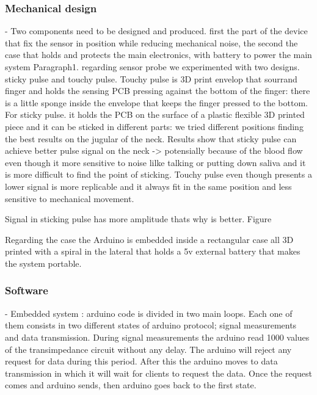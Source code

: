 \documentclass[conference]{IEEEtran}
\begin{document}
      \subsubsection{Mechanical design}
            - Two components need to be designed and produced. first the part of the device that fix the sensor in position while reducing mechanical noise, the second the case that holds and protects the main electronics, 
            with battery to power the main system
            Paragraph1. regarding sensor probe we experimented with two designs. sticky pulse and touchy pulse. Touchy pulse is 3D print envelop that sourrand finger 
            and holds the sensing PCB pressing against the bottom of the finger: there is a little sponge inside the envelope that keeps the finger pressed to the bottom. 
            For sticky pulse. it holds the PCB on the surface of a plastic flexible 3D printed piece and it can be sticked in different parts: we tried different positions finding the best results on the jugular of the neck.
             Results show that sticky pulse can achieve better pulse signal on the neck -> potensially because of the blood flow even though it more sensitive to noise lilke talking or putting down saliva and it is more difficult to find the point of sticking.
             Touchy pulse even though presents a lower signal is more replicable and it always fit in the same position and less sensitive to mechanical movement. 

            Signal in sticking pulse has more amplitude thats why is better. Figure  

            Regarding the case the Arduino is embedded inside a rectangular case all 3D printed with a spiral in the lateral that holds a 5v external battery that makes the system portable.

      \subsubsection{Software}
          - Embedded system : arduino code is divided in two main loops. Each one of them consists in two different states of arduino protocol; signal measurements and data transmission.
          During signal measurements the arduino read 1000 values of the transimpedance circuit without any delay. The arduino will reject any request for data during this period.
          After this the arduino moves to data transmission in which it will wait for clients to request the data. Once the request comes and arduino sends, then arduino goes back to the first state.
          
\end{document}
